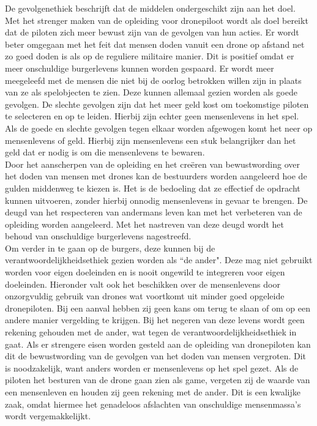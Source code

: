 De gevolgenethiek beschrijft dat de middelen ondergeschikt zijn aan het doel. Met het strenger maken van de opleiding voor dronepiloot wordt als doel bereikt dat de piloten zich meer bewust zijn van de gevolgen van hun acties. Er wordt beter omgegaan met het feit dat mensen doden vanuit een drone op afstand net zo goed doden is als op de reguliere militaire manier. Dit is positief omdat er meer onschuldige burgerlevens kunnen worden gespaard. Er wordt meer meegeleefd met de mensen die niet bij de oorlog betrokken willen zijn in plaats van ze als spelobjecten te zien. Deze kunnen allemaal gezien worden als goede gevolgen. De slechte gevolgen zijn dat het meer geld kost om toekomstige piloten te selecteren en op te leiden. Hierbij zijn echter geen mensenlevens in het spel. Als de goede en slechte gevolgen tegen elkaar worden afgewogen komt het neer op mensenlevens of geld. Hierbij zijn mensenlevens een stuk belangrijker dan het geld dat er nodig is om die mensenlevens te bewaren.\\

Door het aanscherpen van de opleiding en het cre\"eren van bewustwording over het doden van mensen met drones kan de bestuurders worden aangeleerd hoe de gulden middenweg te kiezen is. Het is de bedoeling dat ze effectief de opdracht kunnen uitvoeren, zonder hierbij onnodig mensenlevens in gevaar te brengen. De deugd van het respecteren van andermans leven kan met het verbeteren van de opleiding worden aangeleerd. Met het nastreven van deze deugd wordt het behoud van onschuldige burgerlevens nagestreefd.\\

Om verder in te gaan op de burgers, deze kunnen bij de verantwoordelijkheidsethiek gezien worden als ``de ander". Deze mag niet gebruikt worden voor eigen doeleinden en is nooit ongewild te integreren voor eigen doeleinden. Hieronder valt ook het beschikken over de mensenlevens door onzorgvuldig gebruik van drones wat voortkomt uit minder goed opgeleide dronepiloten. Bij een aanval hebben zij geen kans om terug te slaan of om op een andere manier vergelding te krijgen. Bij het negeren van deze levens wordt geen rekening gehouden met de ander, wat tegen de verantwoordelijkheidsethiek in gaat. Als er strengere eisen worden gesteld aan de opleiding van dronepiloten kan dit de bewustwording van de gevolgen van het doden van mensen vergroten. Dit is noodzakelijk, want anders worden er mensenlevens op het spel gezet. Als de piloten het besturen van de drone gaan zien als game, vergeten zij de waarde van een mensenleven en houden zij geen rekening met de ander. Dit is een kwalijke zaak, omdat hiermee het genadeloos afslachten van onschuldige mensenmassa's wordt vergemakkelijkt.\\

